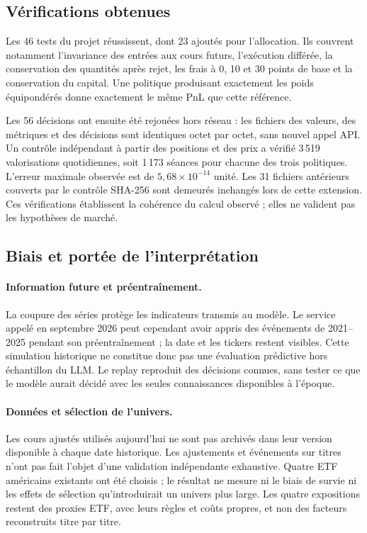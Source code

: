 \subsection{Vérifications obtenues}

Les 46 tests du projet réussissent, dont 23 ajoutés pour l'allocation. Ils couvrent notamment l'invariance des entrées aux cours futurs, l'exécution différée, la conservation des quantités après rejet, les frais à 0, 10 et 30 points de base et la conservation du capital. Une politique produisant exactement les poids équipondérés donne exactement le même PnL que cette référence.

Les 56 décisions ont ensuite été rejouées hors réseau : les fichiers des valeurs, des métriques et des décisions sont identiques octet par octet, sans nouvel appel API. Un contrôle indépendant à partir des positions et des prix a vérifié 3\,519 valorisations quotidiennes, soit 1\,173 séances pour chacune des trois politiques. L'erreur maximale observée est de $5{,}68\times10^{-14}$ unité. Les 31 fichiers antérieurs couverts par le contrôle SHA-256 sont demeurés inchangés lors de cette extension. Ces vérifications établissent la cohérence du calcul observé ; elles ne valident pas les hypothèses de marché.

\subsection{Biais et portée de l'interprétation}\label{sec:biais-allocation}

\paragraph*{Information future et préentraînement.}
La coupure des séries protège les indicateurs transmis au modèle. Le service appelé en septembre 2026 peut cependant avoir appris des événements de 2021--2025 pendant son préentraînement ; la date et les tickers restent visibles. Cette simulation historique ne constitue donc pas une évaluation prédictive hors échantillon du LLM. Le replay reproduit des décisions connues, sans tester ce que le modèle aurait décidé avec les seules connaissances disponibles à l'époque.

\paragraph*{Données et sélection de l'univers.}
Les cours ajustés utilisés aujourd'hui ne sont pas archivés dans leur version disponible à chaque date historique. Les ajustements et événements sur titres n'ont pas fait l'objet d'une validation indépendante exhaustive. Quatre ETF américains existants ont été choisis ; le résultat ne mesure ni le biais de survie ni les effets de sélection qu'introduirait un univers plus large. Les quatre expositions restent des proxies ETF, avec leurs règles et coûts propres, et non des facteurs reconstruits titre par titre.

